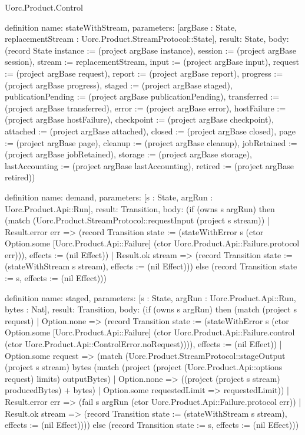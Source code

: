 \begin{lexlean}{Uorc.Product.Control}
\begin{semanticmodule}
definition{
  name: stateWithStream,
  parameters: [argBase : State, replacementStream : Uorc.Product.StreamProtocol::State],
  result: State,
  body: (record State {instance := (project argBase instance), session := (project argBase session), stream := replacementStream, input := (project argBase input), request := (project argBase request), report := (project argBase report), progress := (project argBase progress), staged := (project argBase staged), publicationPending := (project argBase publicationPending), transferred := (project argBase transferred), error := (project argBase error), hostFailure := (project argBase hostFailure), checkpoint := (project argBase checkpoint), attached := (project argBase attached), closed := (project argBase closed), page := (project argBase page), cleanup := (project argBase cleanup), jobRetained := (project argBase jobRetained), storage := (project argBase storage), lastAccounting := (project argBase lastAccounting), retired := (project argBase retired)})
}

definition{
  name: demand,
  parameters: [s : State, argRun : Uorc.Product.Api::Run],
  result: Transition,
  body: (if (owns s argRun) then (match (Uorc.Product.StreamProtocol::requestInput (project s stream))
    | Result.error err => (record Transition {state := (stateWithError s (ctor Option.some [Uorc.Product.Api::Failure] (ctor Uorc.Product.Api::Failure.protocol err))), effects := (nil Effect)})
    | Result.ok stream => (record Transition {state := (stateWithStream s stream), effects := (nil Effect)})) else (record Transition {state := s, effects := (nil Effect)}))
}

definition{
  name: staged,
  parameters: [s : State, argRun : Uorc.Product.Api::Run, bytes : Nat],
  result: Transition,
  body: (if (owns s argRun) then (match (project s request)
    | Option.none => (record Transition {state := (stateWithError s (ctor Option.some [Uorc.Product.Api::Failure] (ctor Uorc.Product.Api::Failure.control (ctor Uorc.Product.Api::ControlError.noRequest)))), effects := (nil Effect)})
    | Option.some request => (match (Uorc.Product.StreamProtocol::stageOutput (project s stream) bytes (match (project (project (Uorc.Product.Api::options request) limits) outputBytes)
        | Option.none => ((project (project s stream) producedBytes) + bytes)
        | Option.some requestedLimit => requestedLimit))
      | Result.error err => (fail s argRun (ctor Uorc.Product.Api::Failure.protocol err))
      | Result.ok stream => (record Transition {state := (stateWithStream s stream), effects := (nil Effect)}))) else (record Transition {state := s, effects := (nil Effect)}))
}


\end{semanticmodule}
\end{lexlean}
